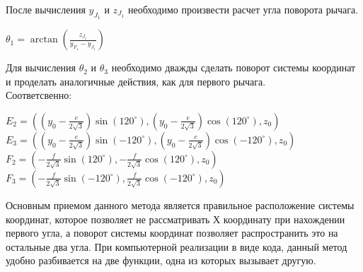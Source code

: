 После вычисления $y_{J_{1}}$ и $z_{J_{1}}$ необходимо произвести расчет угла поворота рычага. 
\begin{center}

    $\theta_{1} = \arctan{(\frac{z_{J_{1}}}{ y_{F_{1}} - y_{J_{1}}  }  )}$
\end{center}


Для вычисления $\theta_{2}$ и $\theta_{3}$ необходимо дважды сделать поворот системы координат и проделать аналогичные действия, как для первого рычага.\\

Соответсвенно:

\begin{center}

    $E_{2} = ((y_{0} - \frac{e}{2\sqrt{3}})\sin{(120^{\circ})} , (y_{0} - \frac{e}{2 \sqrt{3}}) \cos{(120^{\circ})}, z_{0}  )$\\

    \vspace{0.5cm}
    $E_{3} = ((y_{0} - \frac{e}{2\sqrt{3}})\sin{(-120^{\circ})} , (y_{0} - \frac{e} {2\sqrt{3}}) \cos{(-120^{\circ})}, z_{0}  )$\\

    \vspace{0.5cm}
    $F_{2} = ( - \frac{f}{2\sqrt{3}}\sin{(120^{\circ})} ,  - \frac{f}{2\sqrt{3}}\cos{(120^{\circ})}, z_{0}   ) $\\

    \vspace{0.5cm}
    $F_{3} = (- \frac{f}{2\sqrt{3}}\sin{(-120^{\circ})} , \frac{f}{2\sqrt{3}}\cos{(-120^{\circ})}, z_{0}   ) $\\

\end{center}

Основным приемом данного метода является правильное расположение системы координат, которое позволяет не рассматривать Х координату при нахождении первого угла, а поворот системы координат позволяет распространить это на остальные два угла. При компьютерной реализации в виде кода, данный метод удобно разбивается на две функции, одна из которых вызывает другую.  







